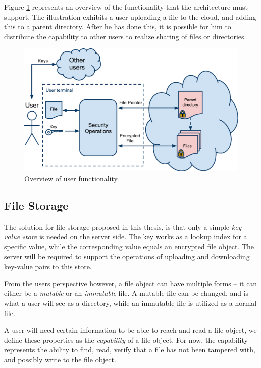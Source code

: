 \documentclass[pdftex,english,10pt,b5paper,twoside]{book}
\begin{document}
Figure \ref{fig:AS:overview} represents an overview of the functionality that
the architecture must support. The illustration exhibits a user uploading a
file to the cloud, and adding this to a parent directory. After he has done
this, it is possible for him to distribute the capability to other users to
realize sharing of files or directories.

\begin{figure}[h!]
    \centering
    \includegraphics[width=\columnwidth]{ArchitectureOverview.pdf}
    \caption{Overview of user functionality}
    \label{fig:AS:overview}
\end{figure}

\subsection{File Storage}
\label{sec:AS:FS}

The solution for file storage proposed in this thesis, is that only a simple
\emph{key-value store} is needed on the server side. The key works as a lookup
index for a specific value, while the corresponding value equals an encrypted
file object. The server will be required to support the operations of uploading
and downloading key-value pairs to this store.

From the users perspective however, a file object can have multiple forms -- it
can either be a \emph{mutable} or an \emph{immutable} file. A mutable file can
be changed, and is what a user will see as a directory, while an immutable file
is utilized as a normal file.

A user will need certain information to be able to reach and read a file
object, we define these properties as the \emph{capability} of a file object.
For now, the capability represents the ability to find, read, verify that a
file has not been tampered with, and possibly write to the file object.
\end{document}
